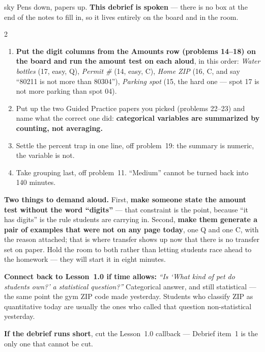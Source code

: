 \documentclass[10pt]{article}
\begin{document}
\boxguard
\begin{skillbox}{sky}
Pens down, papers up. \textbf{This debrief is spoken} --- there is no box at the end of the
notes to fill in, so it lives entirely on the board and in the room.
\begin{multicols}{2}
\begin{enumerate}[leftmargin=1.3em, nosep, itemsep=3pt]
  \item \textbf{Put the digit columns from the Amounts row (problems 14--18) on the board and
        run the amount test on each aloud}, in this order: \emph{Water bottles} (17, easy, Q),
        \emph{Permit \#} (14, easy, C), \emph{Home ZIP} (16, C, and say ``80211 is not more
        than 80304''), \emph{Parking spot} (15, the hard one --- spot 17 is not more parking
        than spot 04).
  \item Put up the two Guided Practice papers you picked (problems 22--23) and name what the
        correct one did: \textbf{categorical variables are summarized by counting, not
        averaging.}
  \item Settle the percent trap in one line, off problem~19: the summary is numeric, the
        variable is not.
  \item Take grouping last, off problem~11. ``Medium'' cannot be turned back into 140 minutes.
\end{enumerate}
\columnbreak
\textbf{Two things to demand aloud.} First, \textbf{make someone state the amount test without
the word ``digits''} --- that constraint is the point, because ``it has digits'' is the rule
students are carrying in. Second, \textbf{make them generate a pair of examples that were not on
any page today}, one Q and one C, with the reason attached; that is where transfer shows up now
that there is no transfer set on paper. Hold the room to both rather than letting students race
ahead to the homework --- they will start it in eight minutes.

\textbf{Connect back to Lesson~1.0 if time allows:} \emph{``Is `What kind of pet do students own?'
a statistical question?''} Categorical answer, and still statistical --- the same point the gym
ZIP code made yesterday. Students who classify ZIP as quantitative today are usually the ones who
called that question non-statistical yesterday.

\textbf{If the debrief runs short}, cut the Lesson~1.0 callback --- Debrief item~1 is the only
one that cannot be cut.
\end{multicols}
\end{skillbox}
\end{document}
